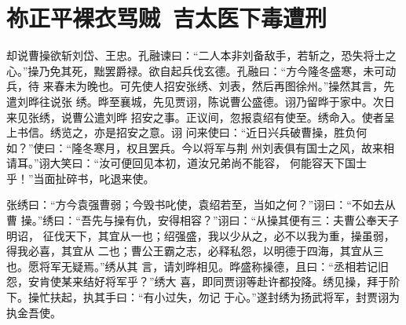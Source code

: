 \chapter{祢正平裸衣骂贼~吉太医下毒遭刑}

却说曹操欲斩刘岱、王忠。孔融谏曰：“二人本非刘备敌手，若斩之，恐失将士之
心。”操乃免其死，黜罢爵禄。欲自起兵伐玄德。孔融曰：“方今隆冬盛寒，未可动兵，待
来春未为晚也。可先使人招安张绣、刘表，然后再图徐州。”操然其言，先遣刘晔往说张
绣。晔至襄城，先见贾诩，陈说曹公盛德。诩乃留晔于家中。次日来见张绣，说曹公遣刘晔
招安之事。正议间，忽报袁绍有使至。绣命入。使者呈上书信。绣览之，亦是招安之意。诩
问来使曰：“近日兴兵破曹操，胜负何如？”使曰：“隆冬寒月，权且罢兵。今以将军与荆
州刘表俱有国士之风，故来相请耳。”诩大笑曰：“汝可便回见本初，道汝兄弟尚不能容，
何能容天下国士乎！”当面扯碎书，叱退来使。

张绣曰：“方今袁强曹弱；今毁书叱使，袁绍若至，当如之何？”诩曰：“不如去从曹
操。”绣曰：“吾先与操有仇，安得相容？”诩曰：“从操其便有三：夫曹公奉天子明诏，
征伐天下，其宜从一也；绍强盛，我以少从之，必不以我为重，操虽弱，得我必喜，其宜从
二也；曹公王霸之志，必释私怨，以明德于四海，其宜从三也。愿将军无疑焉。”绣从其
言，请刘晔相见。晔盛称操德，且曰：“丞相若记旧怨，安肯使某来结好将军乎？”绣大
喜，即同贾诩等赴许都投降。绣见操，拜于阶下。操忙扶起，执其手曰：“有小过失，勿记
于心。”遂封绣为扬武将军，封贾诩为执金吾使。

